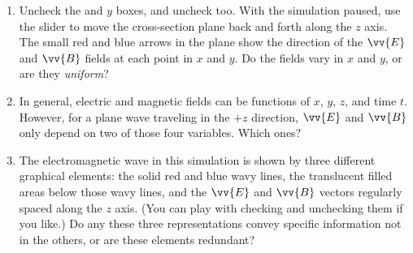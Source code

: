 \begin{enumerate}[labparts]
\item Uncheck the  and $y$ boxes, and uncheck  too.  With the simulation paused, use the slider to move the cross-section plane back and forth along the $z$ axis.  The small red and blue arrows in the plane show the direction of the $\vv {E}$ and $\vv {B}$ fields at each point in $x$ and $y$.  Do the fields vary in $x$ and $y$, or are they \textit{uniform}?
\answerspace{10mm}

\item In general, electric and magnetic fields can be functions of $x$, $y$, $z$, and time $t$. However, for a plane wave traveling in the $+z$ direction, $\vv {E}$ and $\vv {B}$ only depend on two of those four variables.  Which ones?
\answerspace{10mm}

\item The electromagnetic wave in this simulation is shown by three different graphical elements: the solid red and blue wavy lines, the translucent filled areas below those wavy lines, and the $\vv {E}$ and $\vv {B}$ vectors regularly spaced along the $z$ axis.  (You can play with checking and unchecking them if you like.)  Do any these three representations convey specific information not in the others, or are these elements redundant?
\answerspace{10mm}
 

\end{enumerate}

